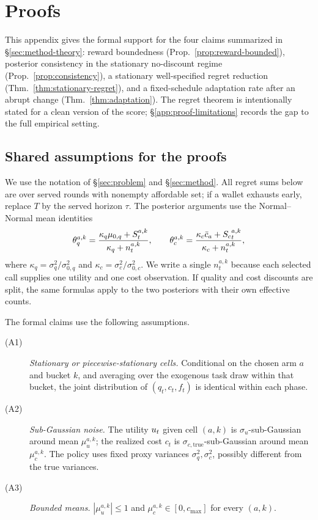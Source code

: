 \section{Proofs}
\label{appendix:proofs}

This appendix gives the formal support for the four claims summarized in
\S\ref{sec:method-theory}: reward boundedness (Prop.~\ref{prop:reward-bounded}),
posterior consistency in the stationary no-discount regime
(Prop.~\ref{prop:consistency}), a stationary well-specified regret reduction
(Thm.~\ref{thm:stationary-regret}), and a fixed-schedule adaptation rate after
an abrupt change (Thm.~\ref{thm:adaptation}). The regret theorem is intentionally
stated for a clean version of the score; \S\ref{app:proof-limitations} records
the gap to the full empirical setting.

\subsection{Shared assumptions for the proofs}
\label{app:proof-setup}

We use the notation of \S\ref{sec:problem} and \S\ref{sec:method}. All regret
sums below are over served rounds with nonempty affordable set; if a wallet
exhausts early, replace $T$ by the served horizon $\tau$. The posterior
arguments use the Normal--Normal mean identities
\begin{equation}
\label{eq:posterior-mean-compact}
\theta_q^{a,k}
= \frac{\kappa_q\mu_{0,q}+S^{a,k}_t}{\kappa_q+n^{a,k}_t},
\qquad
\theta_c^{a,k}
= \frac{\kappa_c\bar c_a+{S_c}^{a,k}_t}{\kappa_c+n^{a,k}_t},
\end{equation}
where $\kappa_q=\sigma_q^2/\sigma_{0,q}^2$ and
$\kappa_c=\sigma_c^2/\sigma_{0,c}^2$.
We write a single $n^{a,k}_t$ because each selected call supplies one utility
and one cost observation. If quality and cost discounts are split, the same
formulas apply to the two posteriors with their own effective counts.

The formal claims use the following assumptions.
\begin{description}
\item[(A1)] \emph{Stationary or piecewise-stationary cells.} Conditional on the
chosen arm $a$ and bucket $k$, and averaging over the exogenous task draw within
that bucket, the joint distribution of $(q_t,c_t,f_t)$ is identical within each
phase.
\item[(A2)] \emph{Sub-Gaussian noise.} The utility $u_t$ given cell $(a,k)$ is
$\sigma_u$-sub-Gaussian around mean $\mu_u^{a,k}$; the realized cost $c_t$ is
$\sigma_{c,\mathrm{true}}$-sub-Gaussian around mean $\mu_c^{a,k}$. The policy
uses fixed proxy variances $\sigma_q^2,\sigma_c^2$, possibly different from the
true variances.
\item[(A3)] \emph{Bounded means.} $|\mu_u^{a,k}|\leq1$ and
$\mu_c^{a,k}\in[0,c_{\max}]$ for every $(a,k)$.
\end{description}

